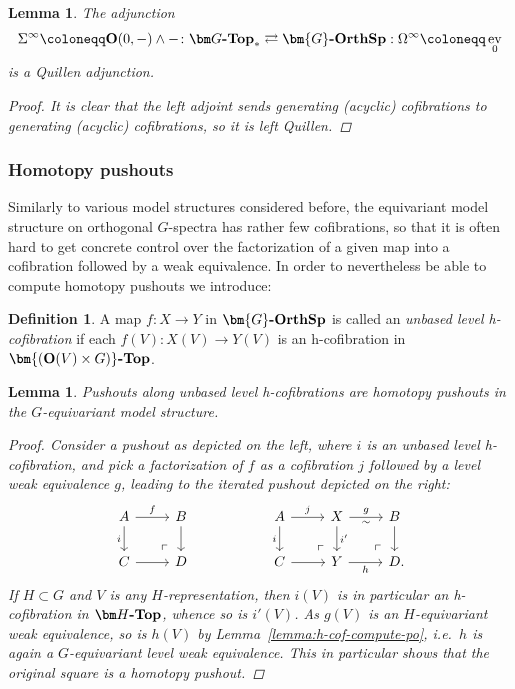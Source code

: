 \documentclass[reqno]{memo-l}
\theoremstyle{mythm}
\newtheorem{lemma}[thm]{Lemma}
\theoremstyle{definition}
\newtheorem{definition}[thm]{Definition}
\numberwithin{equation}{section}
\DeclareMathOperator{\ev}{ev}
\newcommand{\cat}[1]{\textbf{\textup{#1}}}
\renewcommand{\O}{{\textup{O}}}
\let\smashp=\wedge
\newcommand{\Gosp}[1]{\cat{$\bm{#1}$-OrthSp}}
\begin{document}
\begin{lemma}\label{lemma:Sigma-oo-left-Quillen}
    The adjunction 
    \[
        \Sigma^\infty\coloneqq\cat{O}(0,-)\smashp-\colon\cat{$\bm G$-Top}_*\rightleftarrows\Gosp{G}:\Omega^\infty\coloneqq\ev_0
    \]
    is a Quillen adjunction.
    \begin{proof}
        It is clear that the left adjoint sends generating (acyclic) cofibrations to generating (acyclic) cofibrations, so it is left Quillen.
    \end{proof}
\end{lemma}

\subsubsection{Homotopy pushouts} Similarly to various model structures considered before, the equivariant model structure on orthogonal $G$-spectra has rather few cofibrations, so that it is often hard to get concrete control over the factorization of a given map into a cofibration followed by a weak equivalence. In order to nevertheless be able to compute homotopy pushouts we introduce:

\begin{definition}
    A map $f\colon X\to Y$ in $\Gosp{G}$ is called an \emph{unbased level h-cofibration} if each $f(V)\colon X(V)\to Y(V)$ is an h-cofibration in $\cat{$\bm{(\O(V)\times G)}$-Top}$.
\end{definition}

\begin{lemma}\label{lemma:equiv-spectra-homotopy-po}
    Pushouts along unbased level h-cofibrations are homotopy pushouts in the $G$-equivariant model structure.
    \begin{proof}
        Consider a pushout as depicted on the left, where $i$ is an unbased level h-cofibration, and pick a factorization of $f$ as a cofibration $j$ followed by a \emph{level} weak equivalence $g$, leading to the iterated pushout depicted on the right:
        \[
            \begin{tikzcd}
                A\arrow[r, "f"]\arrow[dr,phantom,"\ulcorner"{very near end}]\arrow[d,"i"'] & B\arrow[d] &[3em] A\arrow[dr,phantom,"\ulcorner"{very near end}]\arrow[r, "j"]\arrow[d,"i"'] & X\arrow[dr,phantom,"\ulcorner"{very near end}]\arrow[d,"i'"]\arrow[r,"g","\sim"'] & B\arrow[d]\\
                C\arrow[r] & D & C\arrow[r]& Y\arrow[r,"h"'] & D\rlap.
            \end{tikzcd}
        \]
        If $H\subset G$ and $V$ is any $H$-representation, then $i(V)$ is in particular an h-cofibration in $\cat{$\bm H$-Top}$, whence so is $i'(V)$. As $g(V)$ is an $H$-equivariant weak equivalence, so is $h(V)$ by Lemma~\ref{lemma:h-cof-compute-po}, i.e.\ $h$ is again a $G$-equivariant level weak equivalence. This in particular shows that the original square is a homotopy pushout.
    \end{proof}
\end{lemma}
\end{document}
